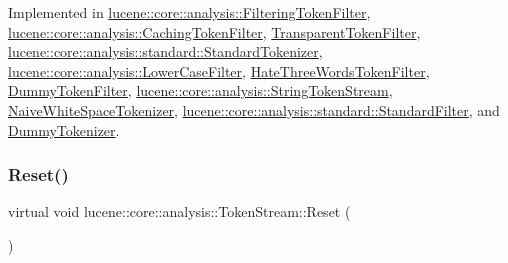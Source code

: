 Implemented in \mbox{\hyperlink{classlucene_1_1core_1_1analysis_1_1FilteringTokenFilter_aa1956aa94779023b3f97b667bd819734}{lucene\+::core\+::analysis\+::\+Filtering\+Token\+Filter}}, \mbox{\hyperlink{classlucene_1_1core_1_1analysis_1_1CachingTokenFilter_acea0a0a5ee61ab8831209c96fde49dc8}{lucene\+::core\+::analysis\+::\+Caching\+Token\+Filter}}, \mbox{\hyperlink{classTransparentTokenFilter_ae0bc79516b4f3fae3af29a9d05b4acf6}{Transparent\+Token\+Filter}}, \mbox{\hyperlink{classlucene_1_1core_1_1analysis_1_1standard_1_1StandardTokenizer_a5702119d01489ede9396db0794a98c41}{lucene\+::core\+::analysis\+::standard\+::\+Standard\+Tokenizer}}, \mbox{\hyperlink{classlucene_1_1core_1_1analysis_1_1LowerCaseFilter_a0e32bf7c330bccfb7ad3c68a374683a7}{lucene\+::core\+::analysis\+::\+Lower\+Case\+Filter}}, \mbox{\hyperlink{classHateThreeWordsTokenFilter_ad843fcf23da10776311702c619c02560}{Hate\+Three\+Words\+Token\+Filter}}, \mbox{\hyperlink{classDummyTokenFilter_a6a57ec2684cc58f61ec807bbebabae63}{Dummy\+Token\+Filter}}, \mbox{\hyperlink{classlucene_1_1core_1_1analysis_1_1StringTokenStream_a059da09c86bcf50a286803cad1b99d10}{lucene\+::core\+::analysis\+::\+String\+Token\+Stream}}, \mbox{\hyperlink{classNaiveWhiteSpaceTokenizer_aa1dcc35eedacdb6107441cb9010d60b0}{Naive\+White\+Space\+Tokenizer}}, \mbox{\hyperlink{classlucene_1_1core_1_1analysis_1_1standard_1_1StandardFilter_a11958d89cb4aed281d083db7be0e8680}{lucene\+::core\+::analysis\+::standard\+::\+Standard\+Filter}}, and \mbox{\hyperlink{classDummyTokenizer_a11402de15d04027b30ce918814e1723d}{Dummy\+Tokenizer}}.

\mbox{\label{classlucene_1_1core_1_1analysis_1_1TokenStream_ae24622f4bc0aeaf0bef924ff1661e023}} 
\subsubsection{\texorpdfstring{Reset()}{Reset()}}
{\footnotesize\ttfamily virtual void lucene\+::core\+::analysis\+::\+Token\+Stream\+::\+Reset (\begin{DoxyParamCaption}{ }\end{DoxyParamCaption})\hspace{0.3cm}{\ttfamily [pure virtual]}}



